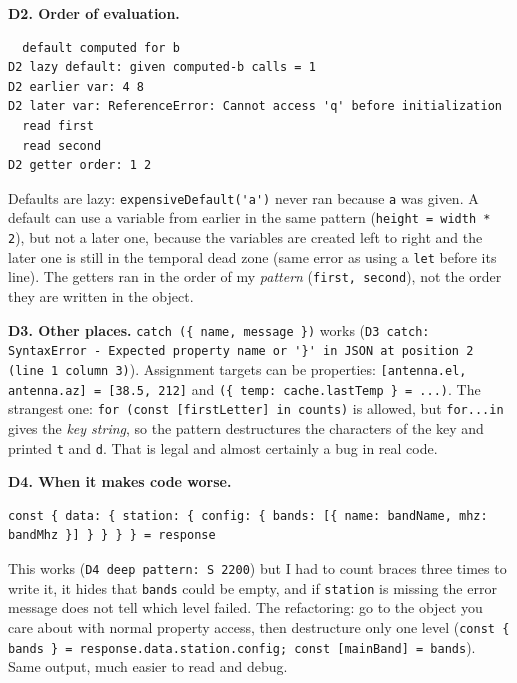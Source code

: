 \textbf{D2. Order of evaluation.}

\begin{lstlisting}
  default computed for b
D2 lazy default: given computed-b calls = 1
D2 earlier var: 4 8
D2 later var: ReferenceError: Cannot access 'q' before initialization
  read first
  read second
D2 getter order: 1 2
\end{lstlisting}

Defaults are lazy: \passthrough{\lstinline!expensiveDefault('a')!} never ran because \passthrough{\lstinline!a!} was given. A default can use a variable from earlier in the same pattern (\passthrough{\lstinline!height = width * 2!}), but not a later one, because the variables are created left to right and the later one is still in the temporal dead zone (same error as using a \passthrough{\lstinline!let!} before its line). The getters ran in the order of my \emph{pattern} (\passthrough{\lstinline!first, second!}), not the order they are written in the object.

\textbf{D3. Other places.} \passthrough{\lstinline!catch (\{ name, message \})!} works (\passthrough{\lstinline!D3 catch: SyntaxError - Expected property name or '\}' in JSON at position 2 (line 1 column 3)!}). Assignment targets can be properties: \passthrough{\lstinline![antenna.el, antenna.az] = [38.5, 212]!} and \passthrough{\lstinline!(\{ temp: cache.lastTemp \} = ...)!}. The strangest one: \passthrough{\lstinline!for (const [firstLetter] in counts)!} is allowed, but \passthrough{\lstinline!for...in!} gives the \emph{key string}, so the pattern destructures the characters of the key and printed \passthrough{\lstinline!t!} and \passthrough{\lstinline!d!}. That is legal and almost certainly a bug in real code.

\textbf{D4. When it makes code worse.}

\begin{lstlisting}
const { data: { station: { config: { bands: [{ name: bandName, mhz: bandMhz }] } } } } = response
\end{lstlisting}

This works (\passthrough{\lstinline!D4 deep pattern: S 2200!}) but I had to count braces three times to write it, it hides that \passthrough{\lstinline!bands!} could be empty, and if \passthrough{\lstinline!station!} is missing the error message does not tell which level failed. The refactoring: go to the object you care about with normal property access, then destructure only one level (\passthrough{\lstinline!const \{ bands \} = response.data.station.config; const [mainBand] = bands!}). Same output, much easier to read and debug.

